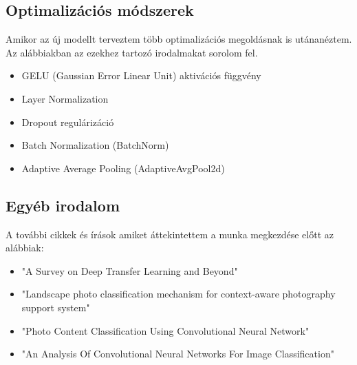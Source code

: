         \subsection{Optimalizációs módszerek}
            Amikor az új modellt terveztem több optimalizációs megoldásnak is utánanéztem. Az alábbiakban az ezekhez tartozó irodalmakat sorolom fel.
            \begin{itemize}
                \item GELU (Gaussian Error Linear Unit) aktivációs függvény\cite{article_GELU}
                \item Layer Normalization\cite{article_LayerNorm}
                \item Dropout regulárizáció\cite{article_dropaut}
                \item Batch Normalization (BatchNorm)\cite{article_BatchNorm}
                \item Adaptive Average Pooling (AdaptiveAvgPool2d)\cite{article_AdaptiveAvgPool2d}
            \end{itemize}
        
        \subsection{Egyéb irodalom}
            A további cikkek és írások amiket áttekintettem a munka megkezdése előtt az alábbiak:
            \begin{itemize}
                \item "A Survey on Deep Transfer Learning and Beyond"\cite{article_Survey_Deep_Transfer}
                \item "Landscape photo classification mechanism for context-aware photography support system" \cite{article_Landscape_photo_classification}
                \item "Photo Content Classification Using Convolutional Neural Network" \cite{article_Photo_Content_Classification}
                \item "An Analysis Of Convolutional Neural Networks For Image Classification"\cite{article_cnn_image_class}
        \end{itemize}